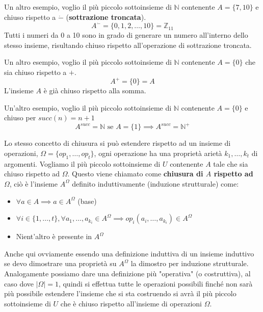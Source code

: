 \documentclass{article}
\begin{document}
Un altro esempio, voglio il più piccolo sottoinsieme di $\mathbb{N}$ contenente $A=\{7,10\}$
e chiuso rispetto a $\dot{-}$ (\textbf{sottrazione troncata}).
$$A^{\dot{-}}=\{0,1,2,\dots,10\}=\mathbb{Z}_{11}$$
Tutti i numeri da 0 a 10 sono in grado di generare un numero all'interno dello stesso
insieme, risultando chiuso rispetto all'operazione di sottrazione troncata.

Un altro esempio, voglio il più piccolo sottoinsieme di $\mathbb{N}$ contenente $A=\{0\}$
che sia chiuso rispetto a $+$.
$$A^+=\{0\}=A$$
L'insieme $A$ è già chiuso rispetto alla somma.

Un'altro esempio, voglio il più piccolo sottoinsieme di $\mathbb{N}$ contenente $A=\{0\}$
e chiuso per $succ(n)=n+1$
$$A^{succ}=\mathbb{N}\text{ se }A=\{1\}\implies A^{succ}=\mathbb{N}^+$$

Lo stesso concetto di chiusura si può estendere rispetto ad un insieme di operazioni, $\Omega=\{op_1,\dots,op_t\}$,
ogni operazione ha una proprietà arietà $k_1,\dots,k_t$ di argomenti. Vogliamo il
più piccolo sottoinsieme di $U$ contenente $A$ tale che sia chiuso rispetto ad $\Omega$. Questo
viene chiamato come \textbf{chiusura di $A$ rispetto ad $\Omega$}, ciò è l'insieme $A^\Omega$
definito induttivamente (induzione strutturale) come:
\begin{itemize}
    \item $\forall a\in A\implies a\in A^\Omega$ (base)
    \item $\forall i\in\{1,\dots,t\}, \forall a_1,\dots,a_{k_i}\in A^\Omega \implies op_i(a_i,\dots,a_{k_i})\in A^\Omega$
    \item Nient'altro è presente in $A^\Omega$
\end{itemize}
Anche qui ovviamente essendo una definizione induttiva di un insieme induttivo se devo dimostrare
una proprietà su $A^\Omega$ la dimostro per induzione strutturale.
Analogamente possiamo dare una definizione più "operativa" (o costruttiva), al caso
dove $|\Omega|=1$, quindi si effettua tutte le operazioni possibili finché non sarà più
possibile estendere l'insieme che si sta costruendo si avrà il più piccolo sottoinsieme di
$U$ che è chiuso rispetto all'insieme di operazioni $\Omega$.
\end{document}
